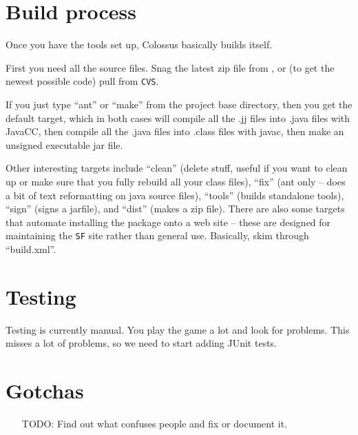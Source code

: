 \documentclass{article}
\begin{document}
\section{Build process}

Once you have the tools set up, Colossus basically builds itself.

First you need all the source files. Snag the latest zip file from 
,
or (to get the newest possible code) pull from \texttt{CVS}.

If you just type ``ant'' or ``make'' from the project base directory,
then you get the default target, which in both cases will compile
all the .jj files into .java files with JavaCC, then compile all
the .java files into .class files with javac, then make an unsigned
executable jar file.

Other interesting targets include ``clean'' (delete stuff, useful if
you want to clean up or make sure that you fully rebuild all your
class files), ``fix'' (ant only -- does a bit of text reformatting on
java source files), ``tools'' (builds standalone tools), ``sign'' (signs
a jarfile), and ``dist'' (makes a zip file). There are also some
targets that automate installing the package onto a web site --
these are designed for maintaining the \texttt{SF} site rather than general
use. Basically, skim through ``build.xml''.

\section{Testing}

Testing is currently manual.  You play the game a lot and look for problems.
This misses a lot of problems, so we need to start adding JUnit tests.

\section{Gotchas}

\begin{itemize}
\item[TODO:] Find out what confuses people and fix or document it.
\end{itemize}



\end{document}
